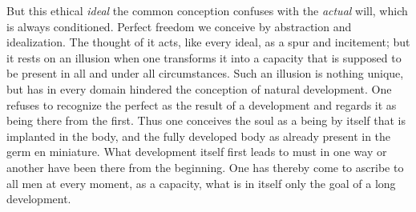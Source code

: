 \documentclass[12pt,a4paper,openany]{book}
\newcommand{\opage}[1]{\marginnote{\footnotesize\textit{[#1]}}}
\begin{document}
But this ethical \emph{ideal} the common conception confuses with the
\emph{actual} will, which is always conditioned. Perfect freedom we conceive
by abstraction and idealization. The thought of it acts, like every ideal,
as a spur and incitement; but it rests on an illusion when one transforms it
into a capacity that is supposed to be present in all and under all
circumstances. Such an illusion is nothing unique, but has in every domain
hindered the conception of natural development. One refuses to recognize the
\opage{132}perfect as the result of a development and regards it as being
there from the first. Thus one conceives the soul as a being by itself that
is implanted in the body, and the fully developed body as already present in
the germ en miniature. What development itself first leads to must in one
way or another have been there from the beginning. One has thereby come to
ascribe to all men at every moment, as a capacity, what is in itself only
the goal of a long development.
\end{document}
